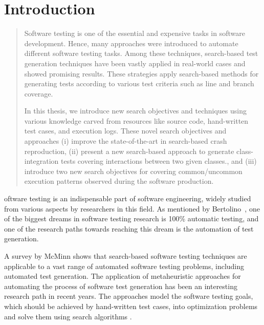 \chapter{Introduction}
\label{introduction}

\begin{abstract}
Software testing is one of the essential and expensive tasks in software development. Hence, many approaches were introduced to automate different software testing tasks. Among these techniques, search-based test generation techniques have been vastly applied in real-world cases and showed promising results. These strategies apply search-based methods for generating tests according to various test criteria such as line and branch coverage.

In this thesis, we introduce new search objectives and techniques using various knowledge carved from resources like source code, hand-written test cases, and execution logs. These novel search objectives and approaches (i) improve the state-of-the-art in search-based crash reproduction, (ii) present a new search-based approach to generate class-integration tests covering interactions between two given classes., and (iii) introduce two new search objectives for covering common/uncommon execution patterns observed during the software production.
\end{abstract}



\newpage
{}oftware testing is an indispensable part of software engineering, widely studied from various aspects by researchers in this field. As mentioned by Bertolino~\cite{bertolino2007software}, one of the biggest dreams in software testing research is 100\% automatic testing, and one of the research paths towards reaching this dream is the automation of test generation.

A survey by McMinn \cite{McMinn2004} shows that search-based software testing techniques are applicable to a vast range of automated software testing problems, including automated test generation. The application of metaheuristic approaches for automating the process of software test generation has been an interesting research path in recent years. The approaches model the software testing goals, which should be achieved by hand-written test cases, into optimization problems and solve them using search algorithms \cite{HarmanSeminal}. 

